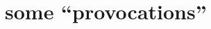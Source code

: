 \documentclass[aspectratio=169,17pt]{beamer} %
\begin{document}


























\section{some ``provocations''}

\end{document}
